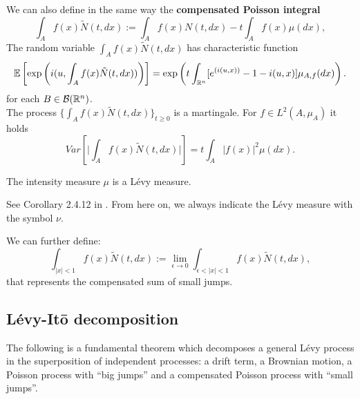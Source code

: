 \noindent
We can also define in the same way the \textbf{compensated Poisson integral}
\begin{equation}
  \int_A f(x) \tilde{N}(t,dx) := \int_A f(x) N(t,dx) - t \int_A f(x) \mu(dx), 
\end{equation}
The random variable $\int_A f(x) \tilde{N}(t,dx)$ has characteristic function
\begin{equation}
  \mathbb{E} \left[ \exp \left( i(u,\int_A f(x) \tilde{N}(t,dx)) \right) \right] = 
  \exp \left( t \int_{\mathbb{R}^n} [e^{(i(u,x))}-1-i(u,x)] \mu_{A,f}(dx) \right).
\end{equation}
for each $B \in \mathcal{B}(\mathbb{R}^n)$. \\
The process $\{\int_A f(x) \tilde N(t,dx)\}_{t \ge 0}$ is a martingale. For $f \in L^2(A,\mu_A)$ it holds
\begin{equation}
 Var \left[ \biggr|\int_A f(x) \tilde N(t,dx)\biggr|\right] = t \int_A |f(x)|^2 \mu(dx).
\end{equation}
\begin{Theorem}
 The intensity measure $\mu$ is a Lévy measure.
\end{Theorem}
 See Corollary 2.4.12 in \cite{Applebaum}. From here on, we always indicate the Lévy measure with the symbol $\nu$.
 
We can further define:
\begin{equation}
\int_{|x|<1} f(x) \tilde N(t,dx) := \lim_{\epsilon \to 0} \int_{\epsilon < |x| < 1} f(x) \tilde N(t,dx), 
\end{equation}
that represents the compensated sum of small jumps.

 
\subsection{Lévy-It\={o} decomposition}

The following is a fundamental theorem which decomposes a general Lévy process in the superposition 
of independent processes: a drift term, a Brownian motion, a Poisson process with ``big jumps'' and a compensated Poisson process with ``small jumps''.

